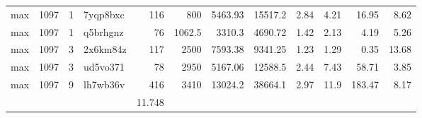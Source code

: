 \documentclass[9pt,a4paper,twocolumn,lineno]{article}
\begin{document}
\begin{table}
\begin{tabular}{lrrlrrrrrrrr}
 max      & 1097 &   1 & 7yqp8bxc & 116 &    800   &  5463.93 & 15517.2  &  2.84 &   4.21 &  16.95 &         8.62 \\
 max      & 1097 &   1 & q5brhgnz &  76 &   1062.5 &  3310.3  &  4690.72 &  1.42 &   2.13 &   4.19 &         5.26 \\
 max      & 1097 &   3 & 2x6km84z & 117 &   2500   &  7593.38 &  9341.25 &  1.23 &   1.29 &   0.35 &        13.68 \\
 max      & 1097 &   3 & ud5vo371 &  78 &   2950   &  5167.06 & 12588.5  &  2.44 &   7.43 &  58.71 &         3.85 \\
 max      & 1097 &   9 & lh7wb36v & 416 &   3410   & 13024.2  & 38664.1  &  2.97 &  11.9  & 183.47 &         8.17 \\
\hline
 &&&& 11.748 &&&&&&&
\\
\end{tabular}
\end{table}\label{table:S1}
\end{document}
